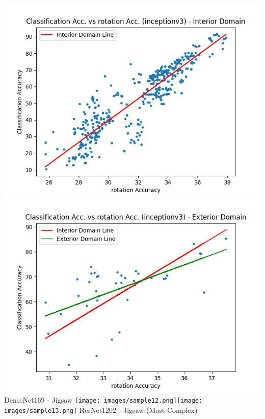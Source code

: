 \documentclass[a4paper]{article}
\begin{document}
{\begin{flushleft}
    \includegraphics[scale=0.16]{images/sample4.png}\includegraphics[scale=0.16]{images/sample5.png}
    DenseNet169 - Jigsaw
    \texttt{[image: images/sample12.png]}\texttt{[image: images/sample13.png]}
    ResNet1202 - Jigsaw (Most Complex)

\end{flushleft}}
\end{document}
